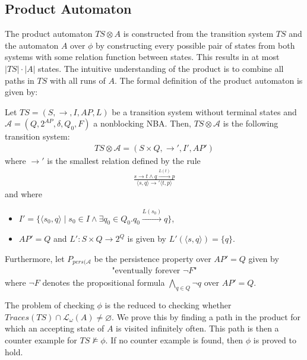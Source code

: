 \subsection{Product Automaton}
\label{sec:product-automaton}
The product automaton $TS \otimes A$ is constructed from the transition system $TS$ and the automaton $A$ over $\phi$ by constructing every possible pair of states from both systems with some relation function between states. This results in at most $|TS|\cdot |A|$ states. The intuitive understanding of the product is to combine all paths in $TS$ with all runs of $A$. The formal definition of the product automaton is given by:
\begin{definition}
Let $TS=\left( S, \longrightarrow, I, AP, L \right)$ be a transition system without terminal states and $\mathcal{A}=\left( Q, 2^{AP}, \delta, Q_0, F \right)$ a nonblocking NBA. Then, $TS \otimes \mathcal{A}$ is the following transition system:
\begin{align*}
    TS \otimes \mathcal{A} = \left( S \times Q, \longrightarrow', I', AP' \right)
\end{align*}
where $\longrightarrow'$ is the smallest relation defined by the rule
\begin{align*}
    \frac{s \longrightarrow t \land q \xrightarrow{L(t)} p}{ \langle s, q \rangle \longrightarrow' \langle t, p \rangle}
\end{align*}
and where
\begin{itemize}
    \item $I' = \{ \langle s_0, q \rangle \mid s_0 \in I \land \exists q_0 \in Q_0 . q_0 \xrightarrow{L(s_0)} q \}$,
    \item $AP' = Q$ and $L' : S \times Q \rightarrow 2^Q$ is given by $L'(\langle s, q \rangle) = \{q\}$.
\end{itemize}
Furthermore, let $P_{pers(\mathcal{A}}$ be the persistence property over $AP' = Q$ given by
\begin{align*}
    \text{"eventually forever $\lnot F$"}
\end{align*}
where $\lnot F$ denotes the propositional formula $\bigwedge\limits_{q \in Q} \lnot q$ over $AP' = Q$.
\end{definition}

The problem of checking $\phi$ is the reduced to checking whether $Traces(TS) \cap \mathcal{L_\omega}(A) \neq \varnothing$. We prove this by finding a path in the product for which an accepting state of $A$ is visited infinitely often. This path is then a counter example for $TS \not\models \phi$. If no counter example is found, then $\phi$ is proved to hold.

